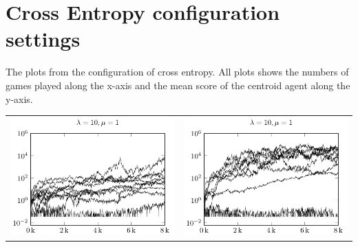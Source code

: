\section{Cross Entropy configuration settings \label{appendixCrossEntropyConfig}}

The plots from the configuration of cross entropy.
All plots shows the numbers of games played along the x-axis
and the mean score of the centroid agent along the y-axis.

\begin{tabular}{@{}l@{}l@{}}
\includegraphics[scale=1]{plots/ce_ConstantNoise_l10_o1_all} &
\includegraphics[scale=1]{plots/ce_ConstantNoise_l10_o5_all}
\end{tabular}

